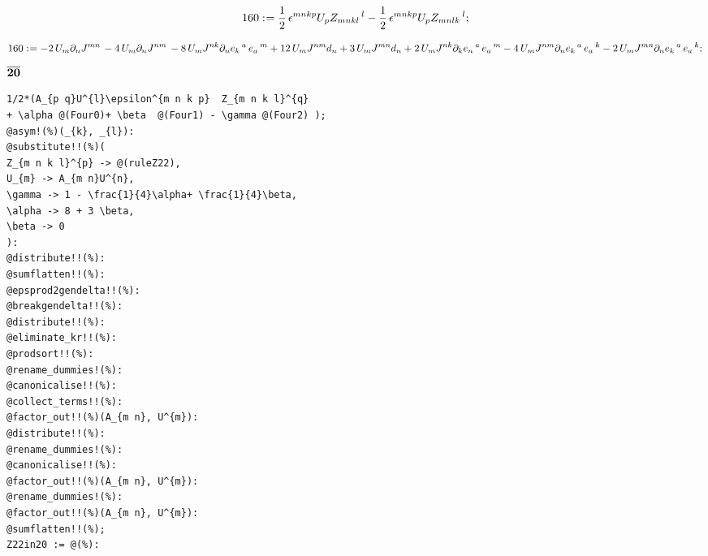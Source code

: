\documentclass[11pt]{article}
\def\specialcolon{\mathrel{\mathop{:}}\hspace{-.5em}}
\renewcommand{\bar}[1]{\overline{#1}}
\begin{document}
\begin{dmath*}[compact, spread=2pt]
160\specialcolon{}= \frac{1}{2}\, {\epsilon}^{m n k p} {U}_{p} {Z}_{m n k l}\,^{l} - \frac{1}{2}\, {\epsilon}^{m n k p} {U}_{p} {Z}_{m n l k}\,^{l};
\end{dmath*}


\begin{dmath*}[compact, spread=2pt]
160\specialcolon{}=  - 2\, {U}_{m} {\partial}_{n}{{J}^{m n}}\,  - 4\, {U}_{m} {\partial}_{n}{{J}^{n m}}\,  - 8\, {U}_{m} {J}^{n k} {\partial}_{n}{{e}_{k}\,^{a}}\,  {e}_{a}\,^{m} + 12\, {U}_{m} {J}^{n m} {d}_{n} + 3\, {U}_{m} {J}^{m n} {d}_{n} + 2\, {U}_{m} {J}^{n k} {\partial}_{k}{{e}_{n}\,^{a}}\,  {e}_{a}\,^{m} - 4\, {U}_{m} {J}^{n m} {\partial}_{n}{{e}_{k}\,^{a}}\,  {e}_{a}\,^{k} - 2\, {U}_{m} {J}^{m n} {\partial}_{n}{{e}_{k}\,^{a}}\,  {e}_{a}\,^{k};
\end{dmath*}
$\bf \bar{20}$
{\color[named]{Blue}\begin{verbatim}
1/2*(A_{p q}U^{l}\epsilon^{m n k p}  Z_{m n k l}^{q} 
+ \alpha @(Four0)+ \beta  @(Four1) - \gamma @(Four2) );
@asym!(%)(_{k}, _{l}):
@substitute!!(%)(
Z_{m n k l}^{p} -> @(ruleZ22),
U_{m} -> A_{m n}U^{n},
\gamma -> 1 - \frac{1}{4}\alpha+ \frac{1}{4}\beta,
\alpha -> 8 + 3 \beta,
\beta -> 0
):
@distribute!!(%):
@sumflatten!!(%):
@epsprod2gendelta!!(%):
@breakgendelta!!(%):
@distribute!!(%):
@eliminate_kr!!(%):
@prodsort!!(%):
@rename_dummies!(%):
@canonicalise!!(%):
@collect_terms!!(%):
@factor_out!!(%)(A_{m n}, U^{m}):
@distribute!!(%):
@rename_dummies!(%):
@canonicalise!!(%):
@factor_out!!(%)(A_{m n}, U^{m}):
@rename_dummies!(%):
@factor_out!!(%)(A_{m n}, U^{m}):
@sumflatten!!(%);
Z22in20 := @(%):
\end{verbatim}}
\end{document}
